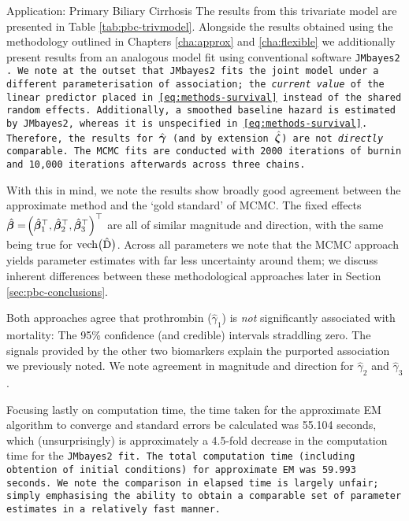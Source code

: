 \begin{chapter}{\label{cha:app-PBC}Application: Primary Biliary Cirrhosis}
  The results from this trivariate model are presented in Table \ref{tab:pbc-trivmodel}. Alongside the results obtained using the methodology outlined in Chapters \ref{cha:approx} and \ref{cha:flexible} we additionally present results from an analogous model fit using conventional software \tt{JMbayes2} \citep{R-JMbayes2}. We note at the outset that \tt{JMbayes2} fits the joint model under a different parameterisation of association; the \textit{current value} of the linear predictor placed in \eqref{eq:methods-survival} instead of the shared random effects. Additionally, a smoothed baseline hazard is estimated by \tt{JMbayes2}, whereas it is unspecified in \eqref{eq:methods-survival}. Therefore, the results for $\hat{\bm{\gamma}}$ (and by extension $\hat{\bm{\zeta}}$) are not \textit{directly} comparable. The MCMC fits are conducted with 2000 iterations of burnin and 10,000 iterations afterwards across three chains.

  With this in mind, we note the results show broadly good agreement between the approximate method and the `gold standard' of MCMC. The fixed effects $\hat{\bm{\beta}}=\!\left(\hat{\bm{\beta}}_1^\top,\hat{\bm{\beta}}_2^\top,\hat{\bm{\beta}}^\top_3\right)^\top$ are all of similar magnitude and direction, with the same being true for $\mathrm{vech}\big(\hat{\mathrm{D}}\big)$. Across all parameters we note that the MCMC approach yields parameter estimates with far less uncertainty around them; we discuss inherent differences between these methodological approaches later in Section \ref{sec:pbc-conclusions}. 
  
  Both approaches agree that prothrombin ($\hat{\gamma}_1$) is \textit{not} significantly associated with mortality: The 95\% confidence (and credible) intervals straddling zero. The signals provided by the other two biomarkers explain the purported association we previously noted. We note agreement in magnitude and direction for $\hat{\gamma}_2$ and $\hat{\gamma}_3$. 
  
  Focusing lastly on computation time, the time taken for the approximate EM algorithm to converge and standard errors be calculated was 55.104 seconds, which (unsurprisingly) is approximately a 4.5-fold decrease in the computation time for the \tt{JMbayes2} fit. The total computation time (\ie including obtention of initial conditions) for approximate EM was 59.993 seconds. We note the comparison in elapsed time is largely unfair; simply emphasising the ability to obtain a comparable set of parameter estimates in a relatively fast manner.


\end{chapter}
